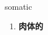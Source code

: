 
\begin{frame}
{\huge somatic}
\begin{center}
\begin{enumerate}\Large
  \item \textbf{肉体的}
\end{enumerate}
\end{center}
\end{frame}
